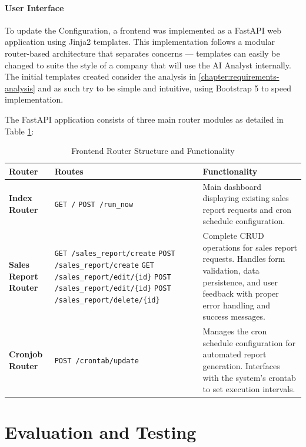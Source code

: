 \documentclass[a4paper]{report}
\begin{document}
\subsubsection{User Interface}

To update the Configuration, a frontend was implemented as a FastAPI web application using Jinja2 templates. This implementation follows a modular router-based architecture that separates concerns --- templates can easily be changed to suite the style of a company that will use the AI Analyst internally. The initial templates created consider the analysis in \autoref{chapter:requirements-analysis} and as such try to be simple and intuitive, using Bootstrap 5 to speed implementation.

The FastAPI application consists of three main router modules as detailed in Table \ref{tab:frontend-routes}:

\begin{table}[H]
\centering
\begin{tabular}{|p{3cm}|p{5.5cm}|p{6cm}|}
\hline
\textbf{Router} & \textbf{Routes} & \textbf{Functionality} \\ \hline
\textbf{Index Router} & 
\texttt{GET /} \newline \texttt{POST /run\_now} & 
Main dashboard displaying existing sales report requests and cron schedule configuration. \\ \hline
\textbf{Sales Report Router} & 
\texttt{GET /sales\_report/create} \newline \texttt{POST /sales\_report/create} \newline \texttt{GET /sales\_report/edit/\{id\}} \newline \texttt{POST /sales\_report/edit/\{id\}} \newline \texttt{POST /sales\_report/delete/\{id\}} & 
Complete CRUD operations for sales report requests. Handles form validation, data persistence, and user feedback with proper error handling and success messages. \\ \hline

\textbf{Cronjob Router} & 
\texttt{POST /crontab/update} & 
Manages the cron schedule configuration for automated report generation. Interfaces with the system's crontab to set execution intervals. \\ \hline
\end{tabular}
\caption{Frontend Router Structure and Functionality}
\label{tab:frontend-routes}
\end{table}

\chapter{Evaluation and Testing}
\label{chapter:evaluation-testing}
\end{document}
